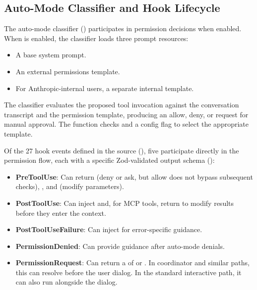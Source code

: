 \subsection{Auto-Mode Classifier and Hook Lifecycle}
\label{sec:auth:classifier}

The auto-mode classifier () participates in permission decisions when enabled. When  is enabled, the classifier loads three prompt resources:

\begin{itemize}[nosep]
  \item A base system prompt.
  \item An external permissions template.
  \item For Anthropic-internal users, a separate internal template.
\end{itemize}

The classifier evaluates the proposed tool invocation against the conversation transcript and the permission template, producing an allow, deny, or request for manual approval. The function  checks  and a  config flag to select the appropriate template.

Of the 27 hook events defined in the source (), five participate directly in the permission flow, each with a specific Zod-validated output schema ():

\begin{itemize}[nosep]
  \item \textbf{PreToolUse}: Can return  (deny or ask, but allow does not bypass subsequent checks), , and  (modify parameters).
  \item \textbf{PostToolUse}: Can inject  and, for MCP tools, return  to modify results before they enter the context.
  \item \textbf{PostToolUseFailure}: Can inject  for error-specific guidance.
  \item \textbf{PermissionDenied}: Can provide  guidance after auto-mode denials.
  \item \textbf{PermissionRequest}: Can return a  of  or . In coordinator and similar paths, this can resolve before the user dialog. In the standard interactive path, it can also run alongside the dialog.
\end{itemize}

